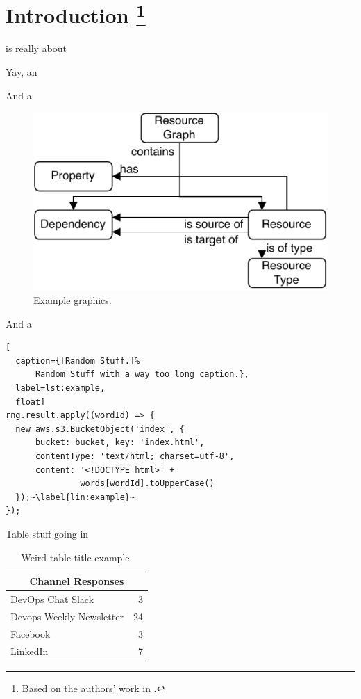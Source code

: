 
\chapter[%
    Introduction%
]{%
    Introduction%
    \footnote{
      Based on the authors' work in \cite{Sokolowski2024Automated,Sokolowski2024Pipr}.
    }
}
\label{sec:intro}

 is really about \lipsum[2]

Yay, an  \lipsum[5]

And a  \lipsum[6]

\begin{figure}
  \includegraphics[width=.5\linewidth]{graphics/example.pdf}
  \caption{Example graphics.}
  \label{fig:example}
\end{figure}

And a  \lipsum[6] 

\begin{lstlisting}[
  caption={[Random Stuff.]%
      Random Stuff with a way too long caption.},
  label=lst:example,
  float]
rng.result.apply((wordId) => {
  new aws.s3.BucketObject('index', {
      bucket: bucket, key: 'index.html',
      contentType: 'text/html; charset=utf-8',
      content: '<!DOCTYPE html>' +
               words[wordId].toUpperCase()
  });~\label{lin:example}~
});
\end{lstlisting}

Table stuff going in  \lipsum[6]
\begin{table}
	\caption{Weird table title example.} 
	\label{tab:example}
	\begin{tabular}{lr}
		\toprule
		\multicolumn{2}{c}{Channel \hspace{2cm} Responses} \\ 
		\midrule
		DevOps Chat Slack & 3 \\ 
		Devops Weekly Newsletter & 24  \\ 
		Facebook & 3 \\ 
		LinkedIn & 7 \\ 
		\bottomrule
	\end{tabular}
\end{table}


